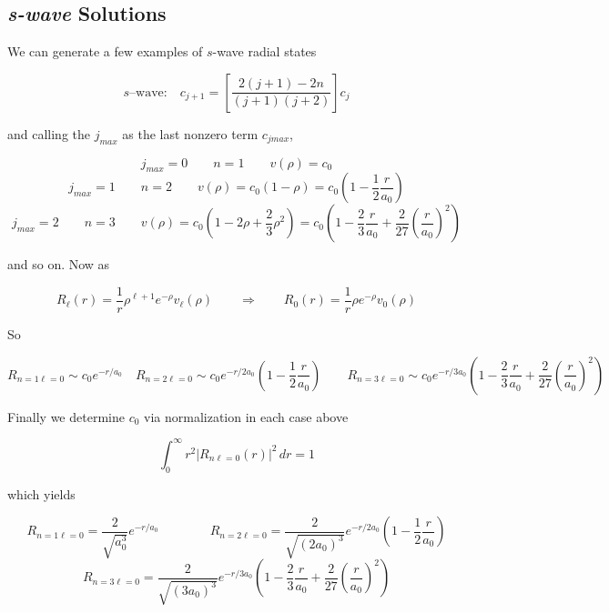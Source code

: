 \vspace{5px}




\subsection{\textit{s-wave} Solutions}

We can generate a few examples of $s$-wave radial states 

\[
  s \text{--wave:} \quad c_{j+1} = \left[ \frac{2(j+1)
  - 2n}{(j+1)(j+2)}\right] c_j
\] \vspace{3px}

and calling the $j_{max}$ as the last nonzero term $c_{jmax}$, 

\[ j_{max} = 0 \qquad n = 1 \qquad v(\rho) = c_0 \] 
\[ j_{max} = 1 \qquad n= 2 \qquad v(\rho) = c_0(1 - \rho) = c_0 \left(1
- \frac{1}{2}\frac{r}{a_0}\right) \] 
\[ j_{max} = 2 \qquad n = 3 \qquad v(\rho) = c_0 \left( 1 - 2\rho + \frac{2}{3}
    \rho^2\right) = c_0 \left( 1 - \frac{2}{3} \frac{r}{a_0} + \frac{2}{27}
  \left( \frac{r}{a_0} \right)^2  \right)  \] \vspace{3px}

and so on. Now as 

\[
  R_\ell (r) = \frac{1}{r} \rho^{\ell +1} e^{-\rho} v_\ell (\rho) \qquad
  \Rightarrow \qquad R_0(r) = \frac{1}{r} \rho e^{-\rho} v_0(\rho)
\] \vspace{3px}

So 

\[
  R_{n=1\ell =0} \sim c_0 e^{-r / a_0} \quad R_{n=2\ell =0} \sim c_0e^{-r/2a_0}
  \left( 1 - \frac{1}{2} \frac{r}{a_0} \right) \qquad R_{n=3\ell =0} \sim c_0
  e^{-r / 3a_0 } \left( 1-\frac{2}{3}\frac{r}{a_0} + \frac{2}{27}\left(
  \frac{r}{a_0} \right) ^2  \right)  
\] \vspace{3px}

Finally we determine $c_0$ via normalization in each case above 

\[
  \int_{0}^{\infty} r^2 |R_{n\ell =0}(r)|^2 \, dr = 1
\] \vspace{3px}

which yields 

\[ R_{n=1\ell =0} = \frac{2}{\sqrt{a_0^3}}e^{-r / a_0}  \qquad \qquad R_{n=2
  \ell =0} = \frac{2}{\sqrt{(2a_0)^3}}e^{-r / 2a_0} \left( 1 - \frac{1}{2}
\frac{r}{a_0} \right) \] 
\[ R_{n=3 \ell = 0} = \frac{2}{\sqrt{(3a_0)^3}}e^{-r / 3a_0} \left(
  1 - \frac{2}{3} \frac{r}{a_0} + \frac{2}{27} \left( \frac{r}{a_0} \right)^2
\right)  \] \vspace{3px}


